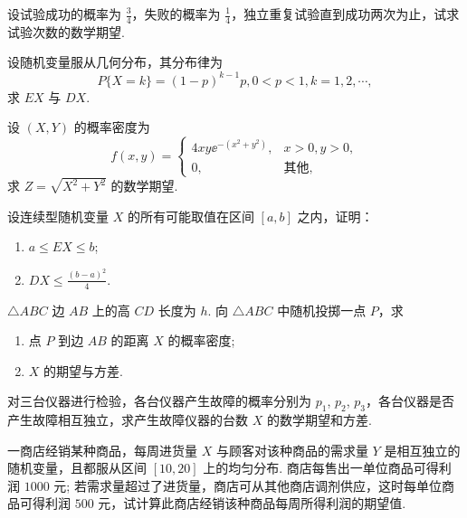 	\begin{titwo}
		设试验成功的概率为 $\frac{3}{4}$，失败的概率为 $\frac{1}{4}$，独立重复试验直到成功两次为止，试求试验次数的数学期望.
	\end{titwo}

	\begin{titwo}
		设随机变量服从几何分布，其分布律为
		\[
			P\{ X = k \} = (1 - p)^{k - 1} p, 0 < p < 1, k = 1,2,\cdots,
		\]
		求 $EX$ 与 $DX$.
	\end{titwo}

	\begin{titwo}
		设 $(X,Y)$ 的概率密度为
		\[
			f(x,y) = \begin{cases}
				4xy \ee^{-(x^{2} + y^{2})}, & x > 0, y > 0, \\
				0, & \text{其他},
			\end{cases}
		\]
		求 $Z = \sqrt{X^{2} + Y^{2}}$ 的数学期望.
	\end{titwo}

	\begin{titwo}
		设连续型随机变量 $X$ 的所有可能取值在区间 $[a,b]$ 之内，证明：
		\begin{enumerate}
			\item $a \leq EX \leq b$;
			\item $DX \leq \frac{(b-a)^{2}}{4}$.
		\end{enumerate}
	\end{titwo}

	\begin{titwo}
		$\triangle ABC$ 边 $AB$ 上的高 $CD$ 长度为 $h$. 向 $\triangle ABC$ 中随机投掷一点 $P$，求
		\begin{enumerate}
			\item 点 $P$ 到边 $AB$ 的距离 $X$ 的概率密度;
			\item $X$ 的期望与方差.
		\end{enumerate}
	\end{titwo}

	\begin{titwo}
		对三台仪器进行检验，各台仪器产生故障的概率分别为 $p_{1}$, $p_{2}$, $p_{3}$，各台仪器是否产生故障相互独立，求产生故障仪器的台数 $X$ 的数学期望和方差.
	\end{titwo}

	\begin{titwo}
		一商店经销某种商品，每周进货量 $X$ 与顾客对该种商品的需求量 $Y$ 是相互独立的随机变量，且都服从区间 $[10,20]$ 上的均匀分布. 商店每售出一单位商品可得利润 $1000$ 元; 若需求量超过了进货量，商店可从其他商店调剂供应，这时每单位商品可得利润 $500$ 元，试计算此商店经销该种商品每周所得利润的期望值.
	\end{titwo}

